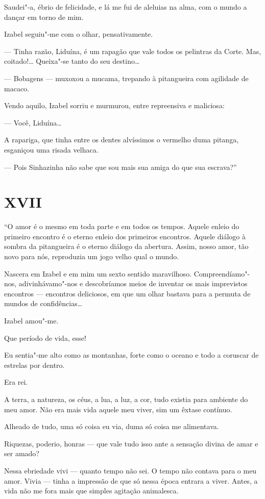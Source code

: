 Saudei"-a, ébrio de felicidade, e lá me fui de aleluias na alma, com o
mundo a dançar em torno de mim.

Izabel seguiu"-me com o olhar, pensativamente.

--- Tinha razão, Liduína, é um rapagão que vale todos os pelintras da
Corte. Mas, coitado!\ldots{} Queixa"-se tanto do seu destino\ldots{}

--- Bobagens --- muxoxou a mucama, trepando à pitangueira com agilidade
de macaco.

Vendo aquilo, Izabel sorriu e murmurou, entre repreensiva e maliciosa:

--- Você, Liduína\ldots{}

A rapariga, que tinha entre os dentes alvíssimos o vermelho duma
pitanga, esganiçou uma risada velhaca.

--- Pois Sinhazinha não sabe que sou mais sua amiga do que sua
escrava?''

\section*{XVII}

``O amor é o mesmo em toda parte e em todos os tempos. Aquele enleio do
primeiro encontro é o eterno enleio dos primeiros encontros. Aquele
diálogo à sombra da pitangueira é o eterno diálogo da abertura. Assim,
nosso amor, tão novo para nós, reproduzia um jogo velho qual o mundo.

Nascera em Izabel e em mim um sexto sentido maravilhoso.
Compreendíamo"-nos, adivinhávamo"-nos e descobríamos meios de inventar os
mais imprevistos encontros --- encontros deliciosos, em que um olhar
bastava para a permuta de mundos de confidências\ldots{}

Izabel amou"-me.

Que período de vida, esse!

Eu sentia"-me alto como as montanhas, forte como o oceano e todo a
coruscar de estrelas por dentro.

Era rei.

A terra, a natureza, os céus, a lua, a luz, a cor, tudo existia para
ambiente do meu amor. Não era mais vida aquele meu viver, sim um êxtase
contínuo.

Alheado de tudo, uma só coisa eu via, duma só coisa me alimentava.

Riquezas, poderio, honras --- que vale tudo isso ante a sensação divina
de amar e ser amado?

Nessa ebriedade vivi --- quanto tempo não sei. O tempo não contava para
o meu amor. Vivia --- tinha a impressão de que só nessa época entrara a
viver. Antes, a vida não me fora mais que simples agitação animalesca.

